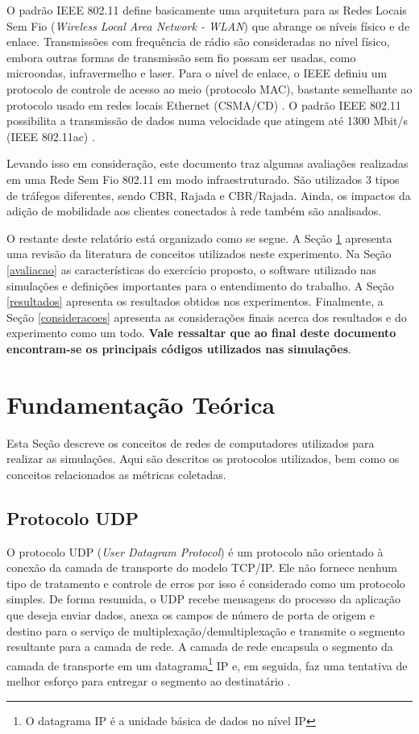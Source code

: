 \documentclass[12pt]{article}
\begin{document}
O padrão IEEE 802.11 define basicamente uma arquitetura para as Redes Locais Sem Fio (\textit{Wireless Local Area Network - WLAN}) que abrange os níveis físico e de enlace. Transmissões com frequência de rádio são consideradas no nível físico, embora outras formas de transmissão sem fio possam ser usadas, como microondas, infravermelho e laser. Para o nível de enlace, o IEEE definiu um protocolo de controle de acesso ao meio (protocolo MAC), bastante semelhante ao protocolo usado em redes locais Ethernet (CSMA/CD) \cite{gtaredesemfio}. O padrão IEEE 802.11 possibilita a transmissão de dados numa velocidade que atingem até 1300 Mbit/s (IEEE 802.11ac) \cite{cisco80211ac, bejarano2013ieee}.

Levando isso em consideração, este documento traz algumas avaliações realizadas em uma Rede Sem Fio 802.11 em modo infraestruturado. São utilizados 3 tipos de tráfegos diferentes, sendo CBR, Rajada e CBR/Rajada. Ainda, os impactos da adição de mobilidade aos clientes conectados à rede também são analisados.

O restante deste relatório está organizado como se segue. A Seção \ref{fundamentacao} apresenta uma revisão da literatura de conceitos utilizados neste experimento. Na Seção \ref{avaliacao} as características do exercício proposto, o software utilizado nas simulações e definições importantes para o entendimento do trabalho.  A Seção \ref{resultados} apresenta os resultados obtidos nos experimentos. Finalmente, a Seção \ref{consideracoes} apresenta as considerações finais acerca dos resultados e do experimento como um todo. \textbf{Vale ressaltar que ao final deste documento encontram-se os principais códigos utilizados nas simulações}.

\section{Fundamentação Teórica}
\label{fundamentacao} 
Esta Seção descreve os conceitos de redes de computadores utilizados para realizar as simulações. Aqui são descritos os protocolos utilizados, bem como os conceitos relacionados as métricas coletadas.

\subsection{Protocolo UDP}

O protocolo UDP (\textit{User Datagram Protocol}) é um protocolo não orientado à conexão da camada de transporte do modelo TCP/IP. Ele não fornece nenhum tipo de tratamento e controle de erros por isso é considerado como um protocolo simples. De forma resumida, o UDP recebe mensagens do processo da aplicação que deseja enviar dados, anexa os campos de número de porta de origem e destino para o serviço de multiplexação/demultiplexação e transmite o segmento resultante para a camada de rede. A camada de rede encapsula o segmento da camada de transporte em um datagrama\footnote{O datagrama IP é a unidade básica de dados no nível IP} IP e, em seguida, faz uma tentativa de melhor esforço para entregar o segmento ao destinatário \cite{kurose2013computer}.
\end{document}

